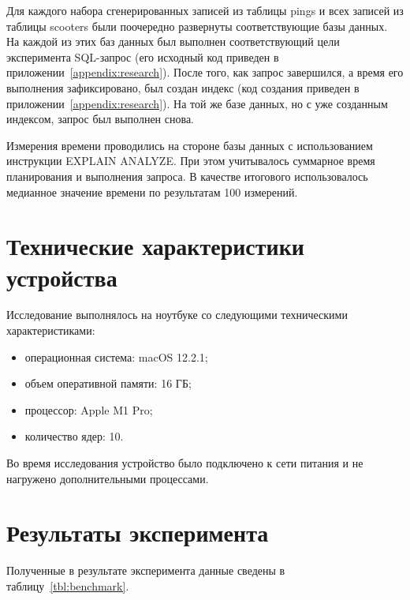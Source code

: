 Для каждого набора сгенерированных записей из таблицы pings и всех записей из таблицы scooters были поочередно развернуты соответствующие базы данных. На каждой из этих баз данных был выполнен соответствующий цели эксперимента SQL-запрос (его исходный код приведен в приложении~\ref{appendix:research}). После того, как запрос завершился, а время его выполнения зафиксировано, был создан индекс (код создания приведен в приложении~\ref{appendix:research}). На той же базе данных, но с уже созданным индексом, запрос был выполнен снова.

Измерения времени проводились на стороне базы данных с использованием инструкции EXPLAIN ANALYZE. При этом учитывалось суммарное время планирования и выполнения запроса. В качестве итогового использовалось медианное значение времени по результатам \num{100} измерений.

\section{Технические характеристики устройства}

Исследование выполнялось на ноутбуке со следующими техническими характеристиками:

\begin{itemize}
    \item операционная система: macOS 12.2.1;
    \item объем оперативной памяти: 16 ГБ;
    \item процессор: Apple M1 Pro;
    \item количество ядер: 10.
\end{itemize}

Во время исследования устройство было подключено к сети питания и не нагружено дополнительными процессами.

\pagebreak
\section{Результаты эксперимента}

Полученные в результате эксперимента данные сведены в таблицу~\ref{tbl:benchmark}.

